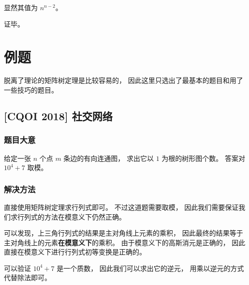 \documentclass[UTF8]{article}
\begin{document}
	显然其值为 $n^{n - 2}$。

	\bigskip

	{\kaishu 证毕。}

	\section{例题}

	脱离了理论的矩阵树定理是比较容易的，
	因此这里只选出了最基本的题目和用了一些技巧的题目。

	\subsection{[CQOI 2018] 社交网络}

	\subsubsection{题目大意}

	给定一张 $n$ 个点 $m$ 条边的有向连通图，
	求出它以 $1$ 为根的树形图个数。
	答案对 $10^4 + 7$ 取模。

	\subsubsection{解决方法}

	直接使用矩阵树定理求行列式即可。
	不过这道题需要取模，
	因此我们需要保证我们求行列式的方法在模意义下仍然正确。

	可以发现，上三角行列式的结果是主对角线上元素的乘积，
	因此最终的结果等于主对角线上的元素\textbf{在模意义下}的乘积。
	由于模意义下的高斯消元是正确的，
	因此直接在模意义下进行行列式初等变换是正确的。

	可以验证 $10^4 + 7$ 是一个质数，
	因此我们可以求出它的逆元，
	用乘以逆元的方式代替除法即可。

	
\end{document}
